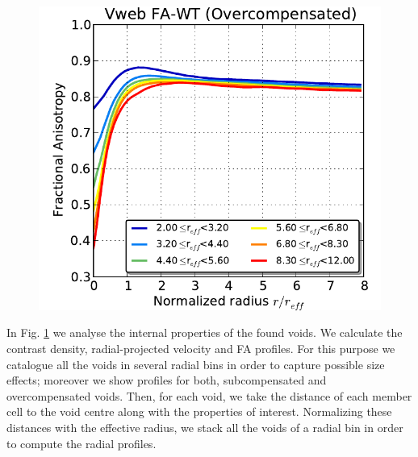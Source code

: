 \documentclass[a4,useAMS,usenatbib,usegraphicx]{latex/mn2e}
\begin{document}
\begin{figure}
  \includegraphics[trim = 1mm 0mm 5mm 0mm, clip, keepaspectratio=true,
  width=0.24\textheight]{./figures/voids_FA_VwebFAG1.pdf}  
  


  \label{fig:RhoVel}
  \vspace{0.1 cm}

\end{figure}


In Fig. \ref{fig:RhoVel} we analyse the internal properties of the found 
voids. We calculate the contrast density, radial-projected velocity and 
FA profiles. For this purpose we catalogue all the voids in several radial 
bins in order to capture possible size effects; moreover we show profiles 
for both, subcompensated and overcompensated voids. Then, for each void, 
we take the distance of each member cell to the void centre along with the 
properties of interest. Normalizing these distances with the effective 
radius, we stack all the voids of a radial bin in order to compute the 
radial profiles.


\end{document}
